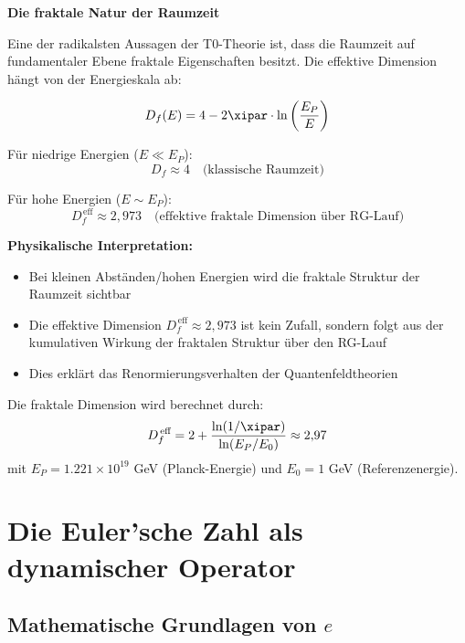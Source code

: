 	\begin{abhandlung}
		\textbf{Die fraktale Natur der Raumzeit}
		
		Eine der radikalsten Aussagen der T0-Theorie ist, dass die Raumzeit auf fundamentaler Ebene fraktale Eigenschaften besitzt. Die effektive Dimension hängt von der Energieskala ab:
		
		\begin{equation}
			D_f(E) = 4 - 2\xipar \cdot \ln\left(\frac{E_P}{E}\right)
		\end{equation}
		
		Für niedrige Energien ($E \ll E_P$):
		\begin{equation}
			D_f \approx 4 \quad \text{(klassische Raumzeit)}
		\end{equation}
		
		Für hohe Energien ($E \sim E_P$):
		\begin{equation}
			D_f^{\,\text{eff}} \approx 2{,}973 \quad \text{(effektive fraktale Dimension über RG-Lauf)}
		\end{equation}
		
		\textbf{Physikalische Interpretation:}
		\begin{itemize}
			\item Bei kleinen Abständen/hohen Energien wird die fraktale Struktur der Raumzeit sichtbar
			\item Die effektive Dimension $D_f^{\,\text{eff}} \approx 2{,}973$ ist kein Zufall, sondern folgt aus der kumulativen Wirkung der fraktalen Struktur über den RG-Lauf
			\item Dies erklärt das Renormierungsverhalten der Quantenfeldtheorien
		\end{itemize}
		
		Die fraktale Dimension wird berechnet durch:
		\begin{equation}
			D_f^{\,\text{eff}} = 2 + \frac{\ln(1/\xipar)}{\ln(E_P/E_0)} \approx 2{,}97
		\end{equation}
		mit $E_P = 1.221 \times 10^{19}$ GeV (Planck-Energie) und $E_0 = 1$ GeV (Referenzenergie).
	\end{abhandlung}
	
	\section{Die Euler'sche Zahl als dynamischer Operator}
	
	\subsection{Mathematische Grundlagen von $e$}
	
